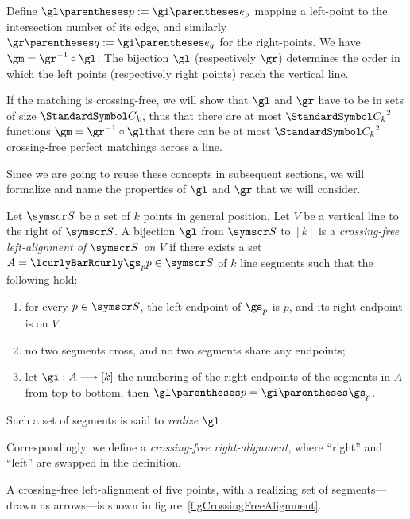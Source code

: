 Define $\gl\of p \DefineAs \gi\of{e_p}$ mapping a left-point to the intersection number of its
edge, and similarly $\gr\of q \DefineAs \gi\of{e_q}$ for the right-points. We have
$\gm = \gr^{-1} \Compose \gl$.
The bijection $\gl$ (respectively $\gr$) determines the order in which the left points (respectively right points)
reach the vertical line.

If the matching is crossing-free, we will show that
$\gl$ and $\gr$ have to be in sets of size $\CatalanNumber k$, thus that there are at most ${\CatalanNumber k}^2$ functions
$\gm = \gr^{-1} \Compose \gl$\idest that there can be at most ${\CatalanNumber k}^2$ crossing-free perfect matchings across a line.

Since we are going to reuse these concepts in subsequent sections, we will formalize and name the properties of
$\gl$ and $\gr$ that we will consider.
\begin{definition}
Let ${\pointset S}$ be a set of $k$ points in general position. Let $V$ be a vertical line to the right of ${\pointset S}$.
A bijection $\gl$ from ${\pointset S}$ to $[k]$ is a \emph{crossing-free left-alignment of ${\pointset S}$ on $V$} if
there exists a set $A=\setst{\gs_p}{p\in{\pointset S}}$ of $k$ line segments such that
the following hold:
\begin{enumerate}
\item for every $p\in{\pointset S}$, the left endpoint of $\gs_p$ is $p$, and its right endpoint is on $V$;
\item no two segments cross, and no two segments share any endpoints;
\item let $\FunctionSpec \gi A {[k]}$ the numbering of the right endpoints of the segments in
$A$ from top to bottom, then $\gl\of p = \gi\of{\gs_p}$.
\end{enumerate}
Such a set of segments is said to \emph{realize} $\gl$.

Correspondingly, we define a \emph{crossing-free right-alignment}, where ``right'' and ``left'' are swapped in the
definition.
\end{definition}
A crossing-free left-alignment of five points, with a realizing set of segments---drawn as arrows---is shown in
figure~\ref{figCrossingFreeAlignment}.

